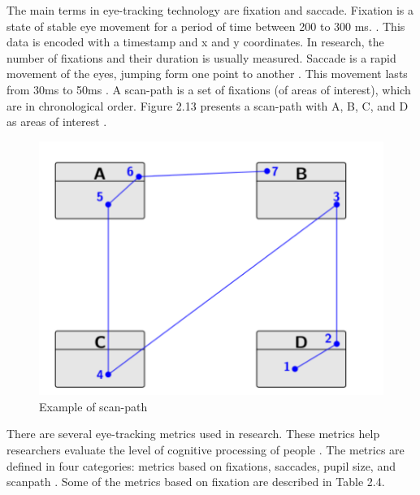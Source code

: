 The main terms in eye-tracking technology are fixation and saccade. 
Fixation is a state of stable eye movement for a period of time between 200 to 300 ms. \cite{sharafi2015systematic}. This data is encoded with a timestamp and x and y coordinates. 
In research, the number of fixations and their duration is usually measured. Saccade is a rapid movement of the eyes, jumping form one point to another \cite{andrzejewska2020development}.
This movement lasts from 30ms to 50ms \cite{obaidellah2018survey}. A scan-path is a set of fixations (of areas of interest), which are in chronological order. Figure 2.13  presents a scan-path with A, B, C, and D as areas of interest  \cite{sharafi2015systematic}.

\begin{figure} [H]
  \centering
  \includegraphics[scale=1]{figures/scanp.png}
  \caption{Example of scan-path \cite{sharafi2015systematic}}
  \label{fig:AnhangsChor}
\end{figure}


 
There are several eye-tracking metrics used in research. These metrics help researchers evaluate the level of cognitive processing of people \cite{obaidellah2018survey}. The metrics are defined in four categories: metrics based on fixations,
saccades, pupil size, and scanpath \cite{sharafi2015eye}. Some of the metrics based on fixation are described in Table 2.4.


